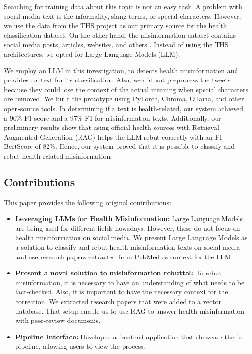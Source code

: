 Searching for training data about this topic is not an easy task. A problem with social media text is the informality, slang terms, or special characters. However, we use the
data from the THS project as our primary source for the health classification dataset. On the other hand, the misinformation dataset contains social media posts, articles,
websites, and others \cite{stephencrone2022,coviddata,covidunesco}. Instead of using the THS architectures, we opted for Large Language Models (LLM). 

We employ an LLM in this investigation, to detects health misinformation and provides context for its classification. Also, we did not preprocess the tweets because they could lose the context of the actual meaning when special characters are removed. We built the prototype using PyTorch, Chroma, Ollama, and other open-source tools. In determining if a text is health-related, our system achieved a 90\% F1 score and a 97\% F1 for misinformation texts. Additionally, our preliminary results show that using official health sources with Retrieval Augmented Generation (RAG) helps the LLM rebut correctly with an F1 BertScore of 82\%. Hence, our system proved that it is possible to classify and rebut health-related misinformation. 

\subsection{Contributions}
This paper provides the following original contributions:
\begin{itemize}
	\item{\textbf{Leveraging LLMs for Health Misinformation:}} Large Language Models are being used for different fields nowadays. However, these do not focus on health misinformation on social media. We present Large Language Models as a solution to classify and rebut health misinformation texts on social media and use research papers extracted from PubMed as context for the LLM.
	\item{\textbf{Present a novel solution to misinformation rebuttal:}} To rebut misinformation, it is necessary to have an understanding of what needs to be fact-checked. Also, it is important to have the necessary context for the correction. We extracted research papers that were added to a vector database. That setup enable us to use RAG to answer health misinformation with peer-review documents.
	\item{\textbf{Pipeline Interface:}} Developed a frontend application that showcase the full pipeline, allowing users to view the process.

\end{itemize}


